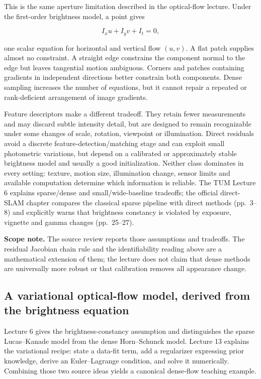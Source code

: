 This is the same aperture limitation described in the optical-flow lecture. Under the first-order brightness model, a point gives

\[
I_x u+I_y v+I_t=0,
\]

one scalar equation for horizontal and vertical flow \((u,v)\). A flat patch supplies almost no constraint. A straight edge constrains the component normal to the edge but leaves tangential motion ambiguous. Corners and patches containing gradients in independent directions better constrain both components. Dense sampling increases the number of equations, but it cannot repair a repeated or rank-deficient arrangement of image gradients.

Feature descriptors make a different tradeoff. They retain fewer measurements and may discard subtle intensity detail, but are designed to remain recognizable under some changes of scale, rotation, viewpoint or illumination. Direct residuals avoid a discrete feature-detection/matching stage and can exploit small photometric variations, but depend on a calibrated or approximately stable brightness model and usually a good initialization. Neither class dominates in every setting: texture, motion size, illumination change, sensor limits and available computation determine which information is reliable. The TUM Lecture 6 explains sparse/dense and small/wide-baseline tradeoffs; the official direct-SLAM chapter compares the classical sparse pipeline with direct methods (pp.~3--8) and explicitly warns that brightness constancy is violated by exposure, vignette and gamma changes (pp.~25--27).

\textbf{Scope note.} The source review reports those assumptions and tradeoffs. The residual Jacobian chain rule and the identifiability reading above are a mathematical extension of them; the lecture does not claim that dense methods are universally more robust or that calibration removes all appearance change.

\subsection{A variational optical-flow model, derived from the brightness equation}\label{02-foundations-ii-ch036-a-variational-optical-flow-model-derived-from-the-brightness-equation}

\hypertarget{02-foundations-ii-ch036-a-variational-optical-flow-model-derived-from-the-brightness-equation}{}

Lecture 6 gives the brightness-constancy assumption and distinguishes the sparse Lucas--Kanade model from the dense Horn--Schunck model. Lecture 13 explains the variational recipe: state a data-fit term, add a regularizer expressing prior knowledge, derive an Euler--Lagrange condition, and solve it numerically. Combining those two source ideas yields a canonical dense-flow teaching example.

